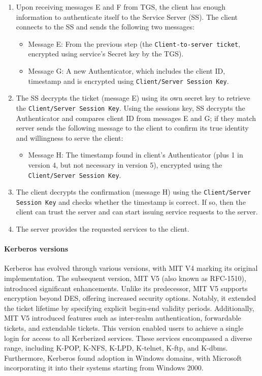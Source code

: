 \begin{enumerate}
  \item Upon receiving messages E and F from TGS, the client has enough information to authenticate itself to the Service Server (SS). The client connects to the SS and sends the following two messages:

        \begin{itemize}
          \item Message E: From the previous step (the \texttt{Client-to-server ticket}, encrypted using service's Secret key by the TGS).
          \item Message G: A new Authenticator, which includes the client ID, timestamp and is encrypted using \texttt{Client/Server Session Key}.
        \end{itemize}

  \item  The SS decrypts the ticket (message E) using its own secret key to retrieve the \texttt{Client/Server Session Key}. Using the sessions key, SS decrypts the Authenticator and compares client ID from messages E and G; if they match server sends the following message to the client to confirm its true identity and willingness to serve the client:

        \begin{itemize}
          \item Message H: The timestamp found in client's Authenticator (plus 1 in version 4, but not necessary in version 5), encrypted using the \texttt{Client/Server Session Key}.
        \end{itemize}

  \item The client decrypts the confirmation (message H) using the \texttt{Client/Server Session Key} and checks whether the timestamp is correct. If so, then the client can trust the server and can start issuing service requests to the server.
  \item The server provides the requested services to the client.
\end{enumerate}


\paragraph{Kerberos versions}
Kerberos has evolved through various versions, with MIT V4 marking its original implementation. The subsequent version, MIT V5 (also known as RFC-1510), introduced significant enhancements.
Unlike its predecessor, MIT V5 supports encryption beyond DES, offering increased security options. Notably, it extended the ticket lifetime by specifying explicit begin-end validity periods.
Additionally, MIT V5 introduced features such as inter-realm authentication, forwardable tickets, and extendable tickets. This version enabled users to achieve a single login for access to all Kerberized services. These services encompassed a diverse range, including K-POP, K-NFS, K-LPD, K-telnet, K-ftp, and K-dbms.
Furthermore, Kerberos found adoption in Windows domains, with Microsoft incorporating it into their systems starting from Windows 2000.

